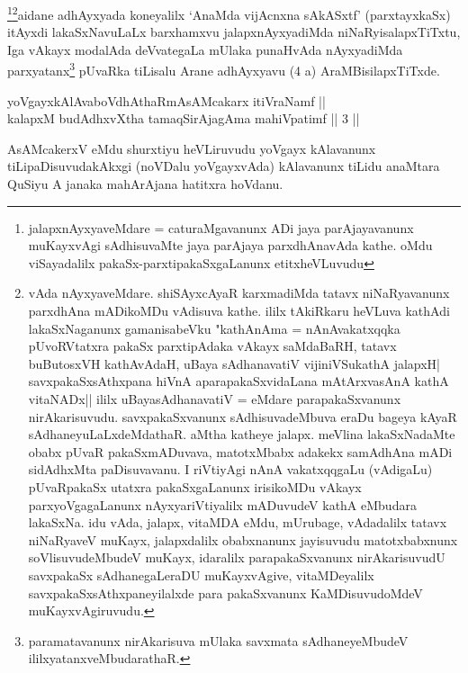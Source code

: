 \begin{artha}
\footnote{jalapxnAyxyaveMdare = caturaMgavanunx ADi jaya parAjayavanunx muKayxvAgi sAdhisuvaMte jaya parAjaya parxdhAnavAda kathe. oMdu viSayadalilx pakaSx-parxtipakaSxgaLanunx etitxheVLuvudu}\footnote{vAda nAyxyaveMdare. shiSAyxcAyaR karxmadiMda tatavx niNaRyavanunx parxdhAna mADikoMDu vAdisuva kathe. ililx tAkiRkaru heVLuva kathAdi lakaSxNaganunx gamanisabeVku "kathAnAma = nAnAvakatxqqka pUvoRVtatxra pakaSx parxtipAdaka vAkayx saMdaBaRH, tatavx buButosxVH kathAvAdaH, uBaya sAdhanavatiV vijiniVSukathA jalapxH| savxpakaSxsAthxpana hiVnA aparapakaSxvidaLana mAtArxvasAnA kathA vitaNADx|| ililx uBayasAdhanavatiV = eMdare parapakaSxvanunx nirAkarisuvudu. savxpakaSxvanunx sAdhisuvadeMbuva eraDu bageya kAyaR sAdhaneyuLaLxdeMdathaR. aMtha katheye jalapx. meVlina lakaSxNadaMte obabx pUvaR pakaSxmADuvava, matotxMbabx adakekx samAdhAna mADi sidAdhxMta paDisuvavanu. I riVtiyAgi nAnA vakatxqqgaLu (vAdigaLu) pUvaRpakaSx utatxra pakaSxgaLanunx irisikoMDu vAkayx parxyoVgagaLanunx nAyxyariVtiyalilx mADuvudeV kathA eMbudara lakaSxNa. idu vAda, jalapx, vitaMDA eMdu, mUrubage, vAdadalilx tatavx niNaRyaveV muKayx, jalapxdalilx obabxnanunx jayisuvudu matotxbabxnunx soVlisuvudeMbudeV muKayx, idaralilx parapakaSxvanunx nirAkarisuvudU savxpakaSx sAdhanegaLeraDU muKayxvAgive, vitaMDeyalilx savxpakaSxsAthxpaneyilalxde para pakaSxvanunx KaMDisuvudoMdeV muKayxvAgiruvudu.}aidane adhAyxyada koneyalilx `AnaMda vijAcnxna sAkASxtf' (parxtayxkaSx) itAyxdi lakaSxNavuLaLx barxhamxvu jalapxnAyxyadiMda niNaRyisalapxTiTxtu, Iga vAkayx modalAda deVvategaLa mUlaka punaHvAda nAyxyadiMda parxyatanx\footnote{paramatavanunx nirAkarisuva mUlaka savxmata sAdhaneyeMbudeV ililxyatanxveMbudarathaR.} pUvaRka tiLisalu Arane adhAyxyavu (4 a) AraMBisilapxTiTxde.
\end{artha}

\begin{shl}
yoVgayxkAlAvaboVdhAthaRmAsAMcakarx itiVraNamf || \\
kalapxM budAdhxvX\s tha tamaqSirAjagAma mahiVpatimf \hfill ||  3 ||  
\end{shl}

\begin{artha}
AsAMcakerxV eMdu shurxtiyu heVLiruvudu yoVgayx kAlavanunx tiLipaDisuvudakAkxgi (noVDalu yoVgayxvAda) kAlavanunx tiLidu anaMtara QuSiyu A janaka mahArAjana hatitxra hoVdanu.
\end{artha}


